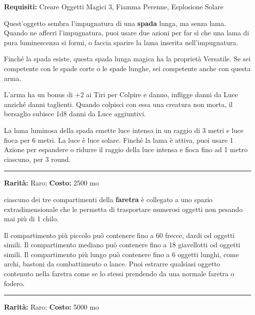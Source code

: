 \begin{multicols}{2}
\textbf{Requisiti:} Creare Oggetti Magici 3, Fiamma Perenne, Esplosione Solare

Quest'oggetto sembra l'impugnatura di una \textbf{spada} lunga, ma senza lama. Quando ne afferri l'impugnatura, puoi usare due azioni per far sì che una lama di pura luminescenza si formi, o faccia sparire la lama inserita nell'impugnatura.

Finché la spada esiste, questa spada lunga magica ha la proprietà Versatile. Se sei competente con le spade corte o le spade lunghe, sei competente anche con questa arma.

L'arma ha un bonus di +2 ai Tiri per Colpire e danno, infligge danni da Luce anziché danni taglienti. Quando colpisci con essa una creatura non morta, il bersaglio subisce 1d8 danni da Luce aggiuntivi.

La lama luminosa della spada emette luce intensa in un raggio di 3 metri e luce fioca per 6 metri. La luce è luce solare. Finché la lama è attiva, puoi usare 1 Azione per espandere o ridurre il raggio della luce intensa e fioca fino ad 1 metro ciascuno, per 3 round.

\smallskip\noindent\rule{\linewidth}{2pt}  \hypertarget{FaretraEfficiente}{}\medskip{}\noindent\label{FaretraEfficiente}

\textbf{Rarità:} Raro; \textbf{Costo:} 2500 mo

ciascuno dei tre compartimenti della \textbf{faretra} è collegato a uno spazio extradimensionale che le permetta di trasportare numerosi oggetti non pesando mai più di 1 chilo.

Il compartimento più piccolo può contenere fino a 60 frecce, dardi od oggetti simili. Il compartimento mediano può contenere fino a 18 giavellotti od oggetti simili. Il compartimento più lungo può contenere fino a 6 oggetti lunghi, come archi, bastoni da combattimento o lance. Puoi estrarre qualsiasi oggetto contenuto nella faretra come se lo stessi prendendo da una normale faretra o fodero.

\smallskip\noindent\rule{\linewidth}{2pt}  \hypertarget{FascediFerrodelVincolo}{}\medskip{}\noindent\label{FascediFerrodelVincolo}

\textbf{Rarità:} Raro; \textbf{Costo:} 5000 mo


\end{multicols}
